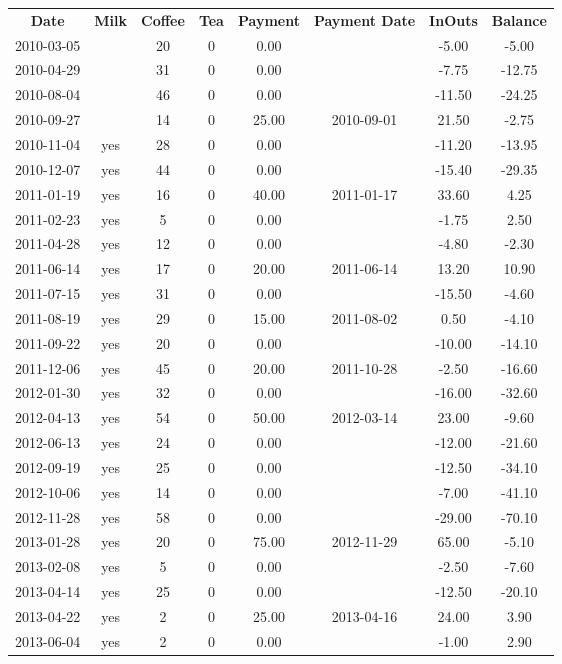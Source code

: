 \begin{center}
\begin{tabular}{cccccccc}
\textbf{Date} & \textbf{Milk} & \textbf{Coffee} & \textbf{Tea} & \textbf{Payment} & \textbf{Payment Date} & \textbf{InOuts} & \textbf{Balance} \\
2010-03-05 &  & 20 & 0 &  0.00 &  &  -5.00 &  -5.00\\ 
2010-04-29 &  & 31 & 0 &  0.00 &  &  -7.75 & -12.75\\ 
2010-08-04 &  & 46 & 0 &  0.00 &  & -11.50 & -24.25\\ 
2010-09-27 &  & 14 & 0 & 25.00 & 2010-09-01 &  21.50 &  -2.75\\ 
2010-11-04 & yes & 28 & 0 &  0.00 &  & -11.20 & -13.95\\ 
2010-12-07 & yes & 44 & 0 &  0.00 &  & -15.40 & -29.35\\ 
2011-01-19 & yes & 16 & 0 & 40.00 & 2011-01-17 &  33.60 &   4.25\\ 
2011-02-23 & yes &  5 & 0 &  0.00 &  &  -1.75 &   2.50\\ 
2011-04-28 & yes & 12 & 0 &  0.00 &  &  -4.80 &  -2.30\\ 
2011-06-14 & yes & 17 & 0 & 20.00 & 2011-06-14 &  13.20 &  10.90\\ 
2011-07-15 & yes & 31 & 0 &  0.00 &  & -15.50 &  -4.60\\ 
2011-08-19 & yes & 29 & 0 & 15.00 & 2011-08-02 &   0.50 &  -4.10\\ 
2011-09-22 & yes & 20 & 0 &  0.00 &  & -10.00 & -14.10\\ 
2011-12-06 & yes & 45 & 0 & 20.00 & 2011-10-28 &  -2.50 & -16.60\\ 
2012-01-30 & yes & 32 & 0 &  0.00 &  & -16.00 & -32.60\\ 
2012-04-13 & yes & 54 & 0 & 50.00 & 2012-03-14 &  23.00 &  -9.60\\ 
2012-06-13 & yes & 24 & 0 &  0.00 &  & -12.00 & -21.60\\ 
2012-09-19 & yes & 25 & 0 &  0.00 &  & -12.50 & -34.10\\ 
2012-10-06 & yes & 14 & 0 &  0.00 &  &  -7.00 & -41.10\\ 
2012-11-28 & yes & 58 & 0 &  0.00 &  & -29.00 & -70.10\\ 
2013-01-28 & yes & 20 & 0 & 75.00 & 2012-11-29 &  65.00 &  -5.10\\ 
2013-02-08 & yes &  5 & 0 &  0.00 &  &  -2.50 &  -7.60\\ 
2013-04-14 & yes & 25 & 0 &  0.00 &  & -12.50 & -20.10\\ 
2013-04-22 & yes &  2 & 0 & 25.00 & 2013-04-16 &  24.00 &   3.90\\ 
2013-06-04 & yes &  2 & 0 &  0.00 &  &  -1.00 &   2.90
\end{tabular}
\end{center}

